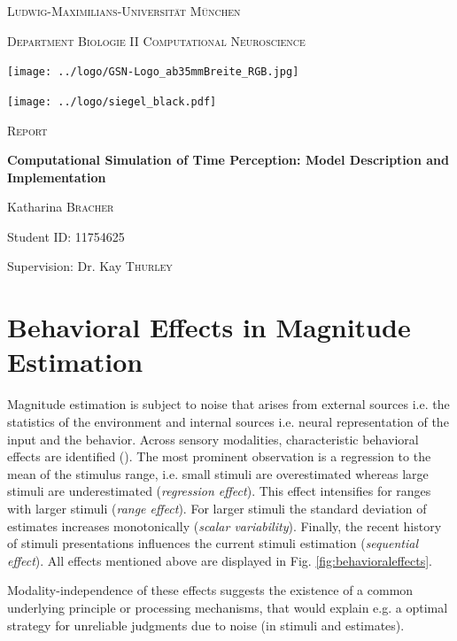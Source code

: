 \documentclass[9pt]{article}
\begin{document}
\begin{titlepage}
	\centering
	{\scshape\LARGE Ludwig-Maximilians-Universität München \par}
	{\scshape\large Department Biologie II Computational Neuroscience \par}
	\vspace{0.5cm}
	\texttt{[image: ../logo/GSN-Logo\_ab35mmBreite\_RGB.jpg]}\par
	\texttt{[image: ../logo/siegel\_black.pdf]}\par
	\vspace{0.7cm}
	{\scshape\LARGE Report \par}
	\vspace{0.05cm}
	{\huge\bfseries Computational Simulation of Time Perception: Model Description and Implementation \par}
	\vspace{1.1cm}
	{\Large Katharina \textsc{Bracher} \par}
	{Student ID: 11754625 \par}
	\vspace{0.4cm}
	{\large Supervision: Dr. Kay \textsc{Thurley} \par}
\end{titlepage}


\normalsize
\tableofcontents
\pagebreak


\section{Behavioral Effects in Magnitude Estimation}
Magnitude estimation is subject to noise that arises from external sources i.e. the statistics of the environment and internal sources i.e. neural representation of the input and the behavior.
Across sensory modalities, characteristic behavioral effects are identified (\cite{Petzschner2015}).
The most prominent observation is a regression to the mean of the stimulus range,  i.e. small stimuli are overestimated whereas large stimuli are underestimated (\textit{regression effect}). 
This effect intensifies for ranges with larger stimuli (\textit{range effect}).
For larger stimuli the standard deviation of estimates increases monotonically (\textit{scalar variability}). 
Finally, the recent history of stimuli presentations influences the current stimuli estimation (\textit{sequential effect}).
All effects mentioned above are displayed in Fig. \ref{fig:behavioraleffects}. 

Modality-independence of these effects suggests the existence of a common underlying principle or processing mechanisms, that would explain e.g. a optimal strategy for unreliable judgments due to noise (in stimuli and estimates).
\end{document}
